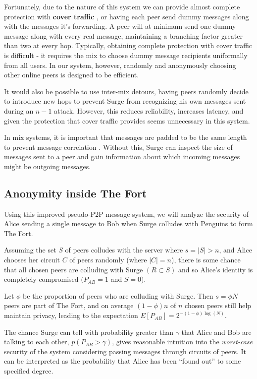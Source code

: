 \documentclass[twocolumn,11pt,english]{article}
\begin{document}
Fortunately, due to the nature of this system we can provide almost complete protection with \textbf{cover traffic} \cite{trickle02}, or having each peer send dummy messages along with the messages it's forwarding. A peer will at minimum send one dummy message along with every real message, maintaining a branching factor greater than two at every hop. Typically, obtaining complete protection with cover traffic is difficult - it requires the mix to choose dummy message recipients uniformally from all users\cite{trickle02}. In our system, however, randomly and anonymously choosing other online peers is designed to be efficient.

It would also be possible to use inter-mix detours\cite{trickle02}, having peers randomly decide to introduce new hops to prevent Surge from recognizing his own messages sent during an $n - 1$ attack. However, this reduces reliability, increases latency, and given the protection that cover traffic provides seems unnecessary in this system. 

 In mix systems, it is important that messages are padded to be the same length to prevent message correlation \cite{chaum-mix}. Without this, Surge can inspect the size of messages sent to a peer and gain information about which incoming messages might be outgoing messages. 

\subsection{Anonymity inside The Fort} 
\label{sec:thefort}
Using this improved pseudo-P2P message system, we will analyze the security of Alice sending a single message to Bob when Surge colludes with Penguins to form The Fort. 

Assuming the set $S$ of peers colludes with the server where $s = |S| > n$, and Alice chooses her circuit $C$ of peers randomly (where $|C| = n$), there is some chance that all chosen peers are colluding with Surge $(R \subset S)$ and so Alice's identity is completely compromised $(P_{AB} = 1$ and $S = 0)$. 

Let $\phi$ be the proportion of peers who are colluding with Surge. Then $s = \phi N$ peers are part of The Fort, and on average $(1 - \phi)n$ of $n$ chosen peers still help maintain privacy, leading to the expectation $E[P_{AB}] = 2^{-(1 - \phi) \log(N)}$. 

The chance Surge can tell with probability greater than $\gamma$ that Alice and Bob are talking to each other, $p(P_{AB} > \gamma)$, gives reasonable intuition into the \textit{worst-case} security of the system considering passing messages through circuits of peers. It can be interpreted as the probability that Alice has been ``found out'' to some specified degree. 
\end{document}
